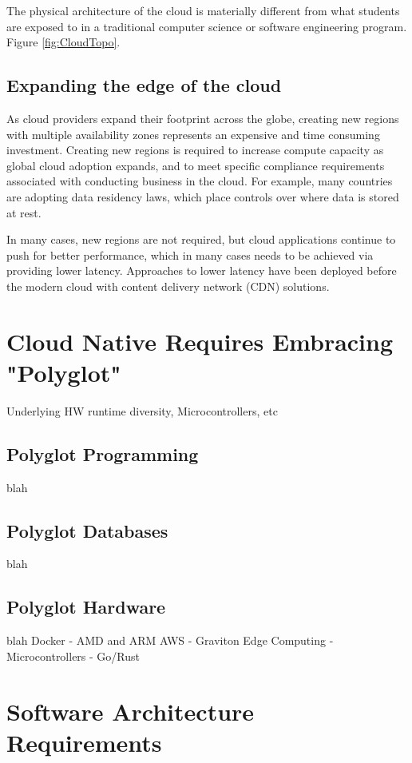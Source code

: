 \documentclass[conference]{IEEEconf}
\begin{document}
The physical architecture of the cloud is materially different from what students are exposed to in a traditional computer science or software engineering program.  Figure \ref{fig:CloudTopo}.

\subsection{Expanding the edge of the cloud}
As cloud providers expand their footprint across the globe, creating new regions with multiple availability zones represents an expensive and time consuming investment. Creating new regions is required to increase compute capacity as global cloud adoption expands, and to meet specific compliance requirements associated with conducting business in the cloud. For example, many countries are adopting data residency laws, which place controls over where data is stored at rest. 

In many cases, new regions are not required, but cloud applications continue to push for better performance, which in many cases needs to be achieved via providing lower latency.  Approaches to lower latency have been deployed before the modern cloud with content delivery network (CDN)\cite{CDN} solutions. 

\section{Cloud Native Requires Embracing "Polyglot"}
Underlying HW runtime diversity, Microcontrollers, etc
\subsection{Polyglot Programming}
blah

\subsection{Polyglot Databases}
blah

\subsection{Polyglot Hardware}
blah
Docker - AMD and ARM
AWS - Graviton
Edge Computing - Microcontrollers - Go/Rust


\section{Software Architecture Requirements}
\label{sec:SoftwareArchitecture}
\end{document}
